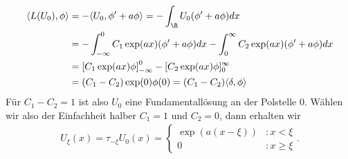 \begin{solution}
\begin{enumerate}[label = (\roman*)]
  \begin{align*}
    \langle L(U_0), \phi \rangle
    &= -\langle U_0, \phi^{\prime} + a\phi \rangle
  = -\int_{\R}U_0(\phi^{\prime} + a\phi)dx \\
  &= -\int_{-\infty}^0C_1\exp(ax)(\phi^{\prime} + a\phi)dx
  -\int_0^{\infty}C_2\exp(ax)(\phi^{\prime} + a\phi)dx \\
  &= \left[C_1\exp(ax)\phi\right]_{-\infty}^0 - [C_2\exp(ax)\phi]_{0}^{\infty}\\
  &= (C_1-C_2)\exp(0)\phi(0) = (C_1 - C_2)\langle \delta, \phi \rangle
  \end{align*}
  Für $C_1 - C_2 = 1$ ist also $U_0$ eine Fundamentallösung
  an der Polstelle $0$. Wählen wir also der Einfachheit halber $C_1 = 1$ und $C_2 = 0$, dann erhalten wir
  \begin{align*}
    U_{\xi}(x) = \tau_{-\xi}U_0(x) =
    \begin{cases}
      \exp(a(x-\xi)) &: x < \xi \\
      0 &: x \geq \xi
    \end{cases}.
  \end{align*}
\end{enumerate}


\end{solution}

